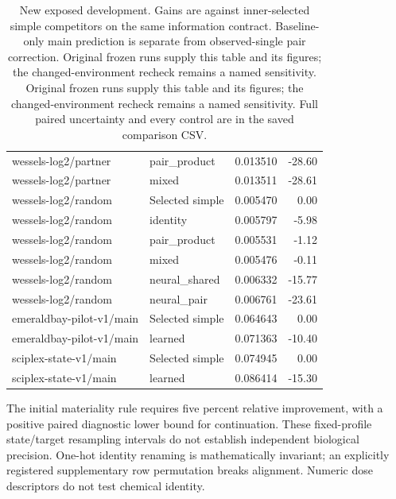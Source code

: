 \begin{table}[htbp]
\begin{tabular}{llrr}
wessels-log2/partner & pair\_product & 0.013510 & -28.60\\

wessels-log2/partner & mixed & 0.013511 & -28.61\\

wessels-log2/random & Selected simple & 0.005470 & 0.00\\

wessels-log2/random & identity & 0.005797 & -5.98\\

wessels-log2/random & pair\_product & 0.005531 & -1.12\\

wessels-log2/random & mixed & 0.005476 & -0.11\\

wessels-log2/random & neural\_shared & 0.006332 & -15.77\\

wessels-log2/random & neural\_pair & 0.006761 & -23.61\\

emeraldbay-pilot-v1/main & Selected simple & 0.064643 & 0.00\\

emeraldbay-pilot-v1/main & learned & 0.071363 & -10.40\\

sciplex-state-v1/main & Selected simple & 0.074945 & 0.00\\

sciplex-state-v1/main & learned & 0.086414 & -15.30\\

\bottomrule\end{tabular}\caption{New exposed development. Gains are against inner-selected simple competitors on the same information contract. Baseline-only main prediction is separate from observed-single pair correction. Original frozen runs supply this table and its figures; the changed-environment recheck remains a named sensitivity. Original frozen runs supply this table and its figures; the changed-environment recheck remains a named sensitivity. Full paired uncertainty and every control are in the saved comparison CSV.}\end{table}

The initial materiality rule requires five percent relative improvement, with a positive paired diagnostic lower bound for continuation. These fixed-profile state/target resampling intervals do not establish independent biological precision. One-hot identity renaming is mathematically invariant; an explicitly registered supplementary row permutation breaks alignment. Numeric dose descriptors do not test chemical identity.


